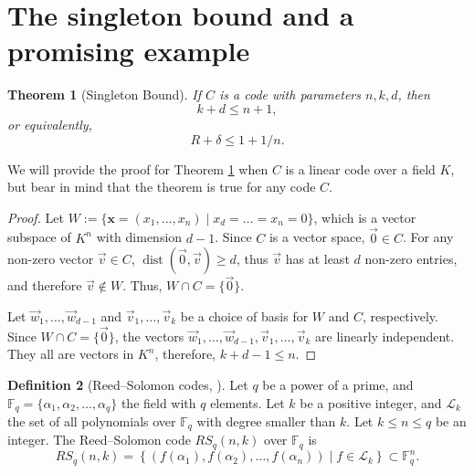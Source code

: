 \documentclass[11pt, oneside]{amsart}
\newtheorem{thm}{Theorem}[section]
\theoremstyle{definition}
\newtheorem{defn}[thm]{Definition}
\theoremstyle{remark}
\numberwithin{equation}{section}
\DeclareMathOperator{\dist}{dist}
\begin{document}
\section{The singleton bound and a promising example} \label{s:singleton}
\begin{thm}[Singleton Bound]\label{thm:singleton_bound}
If $C$ is a code with parameters $n, k, d$, then 
	\begin{equation} %
		k + d \le n + 1,
	\end{equation} 
	or equivalently, 
	\begin{equation}
		R + \delta \le 1 + 1/n.
	\end{equation}
\end{thm}
	
We will provide the proof for Theorem \ref{thm:singleton_bound} when $C$ is a linear code over a field $K$, but bear in mind that the theorem is true for any code $C$.

\begin{proof}
	Let $W := \{\mathbf{x} = (x_1, \dots, x_n) \mid x_{d} = \dots = x_n = 0\}$, which is a vector subspace of $K^n$ with dimension $d - 1$. Since $C$ is a vector space, $\vec 0 \in C$. For any non-zero vector $\vec v \in C$, $\dist(\vec 0, \vec v) \ge d$, thus $\vec v$ has at least $d$ non-zero entries, and therefore $\vec v \notin W$. Thus, $W \cap C = \{\vec 0\}$.

	Let $\vec w_1, \dots, \vec w_{d-1}$ and $\vec v_1, \dots, \vec v_k$ be a choice of basis for $W$ and $C$, respectively. Since $W \cap C = \{\vec 0\}$, the vectors $\vec w_1, \dots, \vec w_{d-1}, \vec v_1, \dots, \vec v_k$ are linearly independent. They all are vectors in $K^n$, therefore, $k + d - 1 \le n$.
\end{proof}

\begin{defn}[Reed--Solomon codes, \cite{LS87}]\label{defn:rs_codes}
	Let $q$ be a power of a prime, and $\mathbb{F}_q = \{\alpha_1, \alpha_2, \dots, \alpha_q\}$ the field with $q$ elements.
	Let $k$ be a positive integer, and $\mathcal L_k$ the set of all polynomials over $\mathbb{F}_q$ with degree smaller than $k$.
	Let $k \le n \le q$ be an integer. The Reed--Solomon code $RS_q(n, k)$ over $\mathbb{F}_q$ is 
	\begin{equation}
		RS_q(n, k) = \left\{\left(f(\alpha_1), f(\alpha_2), \dots, f(\alpha_n)\right) \mid f \in \mathcal L_k\right\} \subset \mathbb{F}_q^n.
	\end{equation}
\end{defn}
\end{document}
